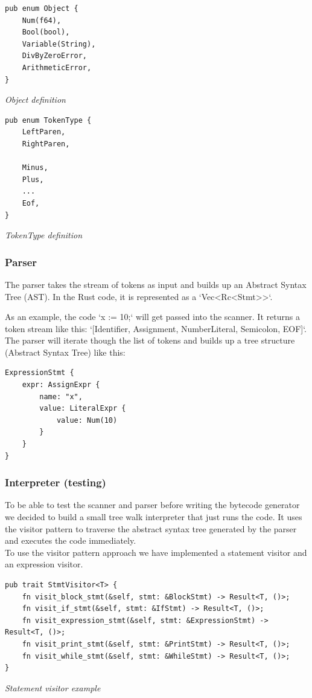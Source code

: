 \documentclass{article}
\begin{document}
\begin{verbatim}
pub enum Object {
    Num(f64),
    Bool(bool),
    Variable(String),
    DivByZeroError,
    ArithmeticError,
}
\end{verbatim}
\textit{Object definition}

\begin{verbatim}
pub enum TokenType {
    LeftParen,
    RightParen,

    Minus,
    Plus,
    ...
    Eof,
}
\end{verbatim}
\textit{TokenType definition}

\subsubsection{Parser}
The parser takes the stream of tokens as input and builds up an Abstract Syntax
Tree (AST). In the Rust code, it is represented as a `Vec<Rc<Stmt>>`.

As an example, the code `x := 10;` will get passed into the scanner. It returns
a token stream like this: `[Identifier, Assignment, NumberLiteral, Semicolon, EOF]`.
The parser will iterate though the list of tokens and builds up a tree
structure (Abstract Syntax Tree) like this:

\begin{verbatim}
ExpressionStmt {
    expr: AssignExpr {
        name: "x",
        value: LiteralExpr {
            value: Num(10)
        }
    }
}
\end{verbatim}

\subsubsection{Interpreter (testing)}
To be able to test the scanner and parser before writing the bytecode generator
we decided to build a small tree walk interpreter that just runs the code.
It uses the visitor pattern to traverse the abstract syntax tree generated by
the parser and executes the code immediately.
\\
To use the visitor pattern approach we have implemented a statement visitor and
an expression visitor.

\begin{verbatim}
pub trait StmtVisitor<T> {
    fn visit_block_stmt(&self, stmt: &BlockStmt) -> Result<T, ()>;
    fn visit_if_stmt(&self, stmt: &IfStmt) -> Result<T, ()>;
    fn visit_expression_stmt(&self, stmt: &ExpressionStmt) -> Result<T, ()>;
    fn visit_print_stmt(&self, stmt: &PrintStmt) -> Result<T, ()>;
    fn visit_while_stmt(&self, stmt: &WhileStmt) -> Result<T, ()>;
}
\end{verbatim}
\textit{Statement visitor example}
\end{document}
